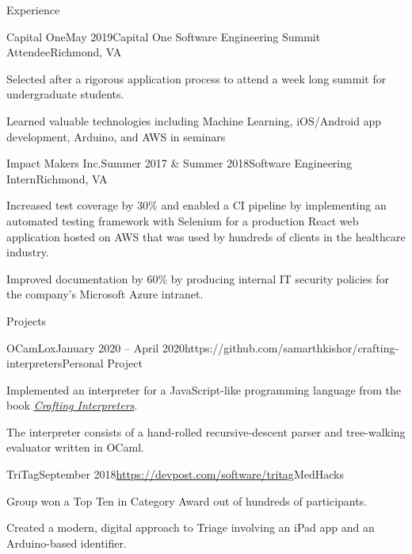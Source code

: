 \documentclass{resume}
\begin{document}
\begin{rSection}{Experience}
  \begin{rSubsection}{Capital One}{May 2019}{Capital One Software Engineering Summit Attendee}{Richmond, VA}
    \item Selected after a rigorous application process to attend a week long summit for undergraduate students.
    \item Learned valuable technologies including Machine Learning, iOS/Android app development, Arduino, and AWS in seminars
  \end{rSubsection}

  \begin{rSubsection}{Impact Makers Inc.}{Summer 2017 \& Summer 2018}{Software Engineering Intern}{Richmond, VA}
    \item Increased test coverage by 30\% and enabled a CI pipeline by implementing an automated testing framework with Selenium for a production React web application hosted on AWS that was used by hundreds of clients in the healthcare industry.
    \item Improved documentation by 60\% by producing internal IT security policies for the company's Microsoft Azure intranet.
  \end{rSubsection}

\end{rSection}

\begin{rSection}{Projects}

  \begin{rSubsection}{OCamLox}{January 2020 -- April 2020}{https://github.com/samarthkishor/crafting-interpreters}{Personal Project}
    \item Implemented an interpreter for a JavaScript-like programming language from the book \href{https://craftinginterpreters.com/}{\textit{Crafting Interpreters}}.
    \item The interpreter consists of a hand-rolled recursive-descent parser and tree-walking evaluator written in OCaml.
  \end{rSubsection}

  \begin{rSubsection}{TriTag}{September 2018}{\url{https://devpost.com/software/tritag}}{MedHacks}
    \item Group won a Top Ten in Category Award out of hundreds of participants.
    \item Created a modern, digital approach to Triage involving an iPad app and an Arduino-based identifier.
  \end{rSubsection}

\end{rSection}
\end{document}
